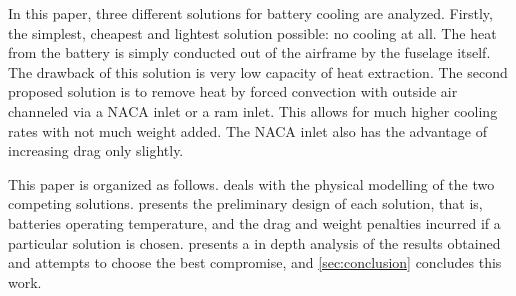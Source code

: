 In this paper, three different solutions for battery cooling are analyzed. 
Firstly, the simplest, cheapest and lightest solution possible: no cooling at all.
The heat from the battery is simply conducted out of the airframe by the fuselage itself. 
The drawback of this solution is very low capacity of heat extraction.
The second proposed solution is to remove heat by forced convection with outside air channeled via a NACA inlet or a ram inlet. 
This allows for much higher cooling rates with not much weight added. 
The NACA inlet also has the advantage of increasing drag only slightly.


This paper is organized as follows. 
 deals with the physical modelling of the two competing solutions. 
 presents the preliminary design of each solution, that is,
    batteries operating temperature, and
    the drag and weight penalties incurred if a particular solution is chosen.
 presents a in depth analysis of the results obtained 
and attempts to choose the best compromise, and
\cref{sec:conclusion} concludes this work.
